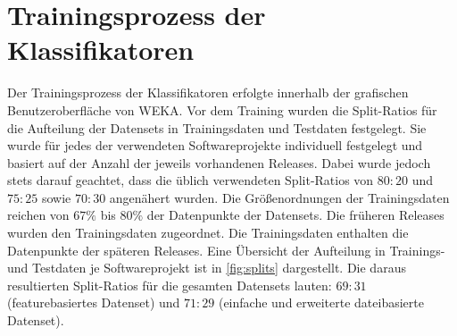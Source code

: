 \section{Trainingsprozess der Klassifikatoren}

Der Trainingsprozess der Klassifikatoren erfolgte innerhalb der grafischen Benutzeroberfläche von WEKA. Vor dem Training wurden die Split-Ratios für die Aufteilung der Datensets in Trainingsdaten und Testdaten festgelegt. Sie wurde für jedes der verwendeten Softwareprojekte individuell festgelegt und basiert auf der Anzahl der jeweils vorhandenen Releases. Dabei wurde jedoch stets darauf geachtet, dass die üblich verwendeten Split-Ratios von $80:20$ und $75:25$ sowie $70:30$ angenähert wurden. Die Größenordnungen der Trainingsdaten reichen von $67\%$ bis $80\%$ der Datenpunkte der Datensets. Die früheren Releases wurden den Trainingsdaten zugeordnet. Die Trainingsdaten enthalten die Datenpunkte der späteren Releases. Eine Übersicht der Aufteilung in Trainings- und Testdaten je Softwareprojekt ist in \autoref{fig:splits} dargestellt. Die daraus resultierten Split-Ratios für die gesamten Datensets lauten: $69:31$ (featurebasiertes Datenset) und $71:29$ (\glqq einfache\grqq{} und erweiterte dateibasierte Datenset).

